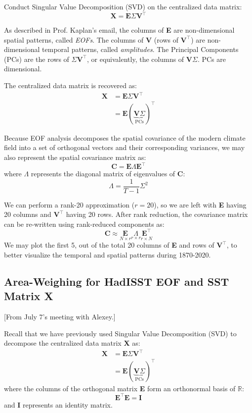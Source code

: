 \documentclass{article}
\begin{document}
Conduct Singular Value Decomposition (SVD) on the centralized data matrix:
$$\textbf{X} = \textbf{E} \Sigma \textbf{V}^\intercal$$

As described in Prof. Kaplan's email, the columns of \textbf{E} are non-dimensional spatial patterns, called \textit{EOFs}. The columns of \textbf{V} (rows of $\textbf{V}^\intercal$) are non-dimensional temporal patterns, called \textit{amplitudes}. The Principal Components (PCs) are the rows of $\Sigma \textbf{V}^\intercal$, or equivalently, the columns of $\textbf{V}\Sigma$. PCs are dimensional.

The centralized data matrix is recovered as:
\begin{align*}
    \textbf{X} &= \textbf{E} \Sigma \textbf{V}^\intercal \\
    &= \textbf{E}{(\underbrace{\textbf{V}\Sigma}_{\text{PCs}})}^\intercal
\end{align*}

Because EOF analysis decomposes the spatial covariance of the modern climate field into a set of orthogonal vectors and their corresponding variances, we may also represent the spatial covariance matrix as:
$$\textbf{C} = \textbf{E} \Lambda \textbf{E}^\intercal$$
where $\Lambda$ represents the diagonal matrix of eigenvalues of \textbf{C}:
$$\Lambda = \frac{1}{T-1}\Sigma^2$$

We can perform a rank-20 approximation ($r=20$), so we are left with \textbf{E} having 20 columns and $\textbf{V}^\intercal$ having 20 rows. After rank reduction, the covariance matrix can be re-written using rank-reduced components as:
$$\textbf{C} \approx \underset{N \times r}{\textbf{E}} \underset{r \times r}{\Lambda} \underset{r \times N}{\textbf{E}^\intercal}$$
We may plot the first 5, out of the total 20 columns of \textbf{E} and rows of $\textbf{V}^\intercal$, to better visualize the temporal and spatial patterns during 1870-2020.


\subsection{Area-Weighing for HadISST EOF and SST Matrix \textbf{X}}
\color{purple} [From July 7's meeting with Alexey.] \color{black}

Recall that we have previously used Singular Value Decomposition (SVD) to decompose the centralized data matrix \textbf{X} as:
\begin{align*}
    \textbf{X} &= \textbf{E} \Sigma \textbf{V}^\intercal \\
    &= \textbf{E}{(\underbrace{\textbf{V}\Sigma}_{\text{PCs}})}^\intercal
\end{align*}
where the columns of the orthogonal matrix \textbf{E} form an orthonormal basis of $\mathbb{R}$:
$$\textbf{E}^\intercal \textbf{E} = \textbf{I}$$
and \textbf{I} represents an identity matrix.
\end{document}
